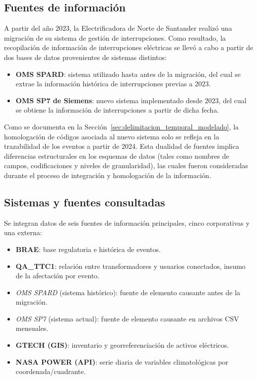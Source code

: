 \subsection{Fuentes de información}
A partir del año $2023$, la Electrificadora de Norte de Santander realizó una migración de su sistema de gestión de interrupciones. Como resultado, la recopilación de información de interrupciones eléctricas se llevó a cabo a partir de dos bases de datos provenientes de sistemas distintos:

\begin{itemize}
\item \textbf{OMS SPARD}: sistema utilizado hasta antes de la migración, del cual se extrae la información histórica de interrupciones previas a $2023$.
        
\item \textbf{OMS SP7 de Siemens}: nuevo sistema implementado desde $2023$, del cual se obtiene la información de interrupciones a partir de dicha fecha.
\end{itemize}

Como se documenta en la Sección~\ref{sec:delimitacion_temporal_modelado}, la homologación de códigos asociada al nuevo sistema solo se refleja en la trazabilidad de los eventos a partir de 2024. Esta dualidad de fuentes implica diferencias estructurales en los esquemas de datos (tales como nombres de campos, codificaciones y niveles de granularidad), las cuales fueron consideradas durante el proceso de integración y homologación de la información.

\subsection{Sistemas y fuentes consultadas}
Se integran datos de seis fuentes de información principales, cinco corporativas y una externa:

\begin{itemize}
        \item \textbf{BRAE}: base regulatoria e histórica de eventos.

        \item \textbf{QA\_TTC1}: relación entre transformadores y usuarios conectados, insumo de la afectación por evento.
        
        \item \textit{OMS SPARD} (sistema histórico): fuente de elemento causante antes de la migración.
        
        \item \textit{OMS SP7} (sistema actual): fuente de elemento causante en archivos CSV mensuales.
        
        \item \textbf{GTECH (GIS)}: inventario y georreferenciación de activos eléctricos.
        
        \item \textbf{NASA POWER (API)}: serie diaria de variables climatológicas por coordenada/cuadrante.
\end{itemize}

